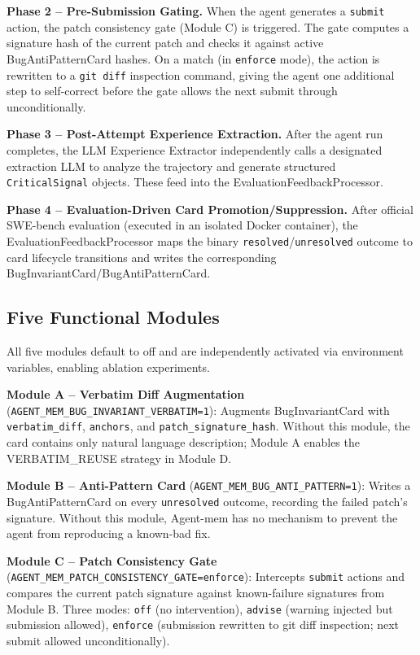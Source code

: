\documentclass{article}
\begin{document}
\textbf{Phase 2 -- Pre-Submission Gating.} When the agent generates a \texttt{submit} action, the patch consistency gate (Module C) is triggered. The gate computes a signature hash of the current patch and checks it against active BugAntiPatternCard hashes. On a match (in \texttt{enforce} mode), the action is rewritten to a \texttt{git diff} inspection command, giving the agent one additional step to self-correct before the gate allows the next submit through unconditionally.

\textbf{Phase 3 -- Post-Attempt Experience Extraction.} After the agent run completes, the LLM Experience Extractor independently calls a designated extraction LLM to analyze the trajectory and generate structured \texttt{CriticalSignal} objects. These feed into the EvaluationFeedbackProcessor.

\textbf{Phase 4 -- Evaluation-Driven Card Promotion/Suppression.} After official SWE-bench evaluation (executed in an isolated Docker container), the EvaluationFeedbackProcessor maps the binary \texttt{resolved}/\texttt{unresolved} outcome to card lifecycle transitions and writes the corresponding BugInvariantCard/BugAntiPatternCard.

\subsection{Five Functional Modules}

All five modules default to off and are independently activated via environment variables, enabling ablation experiments.

\textbf{Module A -- Verbatim Diff Augmentation} (\texttt{AGENT\_MEM\_BUG\_INVARIANT\_VERBATIM=1}): Augments BugInvariantCard with \texttt{verbatim\_diff}, \texttt{anchors}, and \texttt{patch\_signature\_hash}. Without this module, the card contains only natural language description; Module A enables the VERBATIM\_REUSE strategy in Module D.

\textbf{Module B -- Anti-Pattern Card} (\texttt{AGENT\_MEM\_BUG\_ANTI\_PATTERN=1}): Writes a BugAntiPatternCard on every \texttt{unresolved} outcome, recording the failed patch's signature. Without this module, Agent-mem has no mechanism to prevent the agent from reproducing a known-bad fix.

\textbf{Module C -- Patch Consistency Gate} (\texttt{AGENT\_MEM\_PATCH\_CONSISTENCY\_GATE=enforce}): Intercepts \texttt{submit} actions and compares the current patch signature against known-failure signatures from Module B. Three modes: \texttt{off} (no intervention), \texttt{advise} (warning injected but submission allowed), \texttt{enforce} (submission rewritten to git diff inspection; next submit allowed unconditionally).
\end{document}
